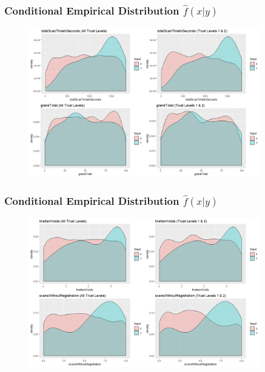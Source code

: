 \documentclass{beamer}
\begin{document}
\begin{frame}
\frametitle{Conditional Empirical Distribution $\hat{f}(x|y)$}
\begin{figure}[H]
		\centering
		\includegraphics[width = 0.9\textwidth]{figure/DATA_P1.png}
	\end{figure}
\end{frame}

\begin{frame}
\frametitle{Conditional Empirical Distribution $\hat{f}(x|y)$}
\begin{figure}[H]
		\centering
		\includegraphics[width = 0.9\textwidth]{figure/DATA_P2.png}
	\end{figure}
\end{frame}
\end{document}
